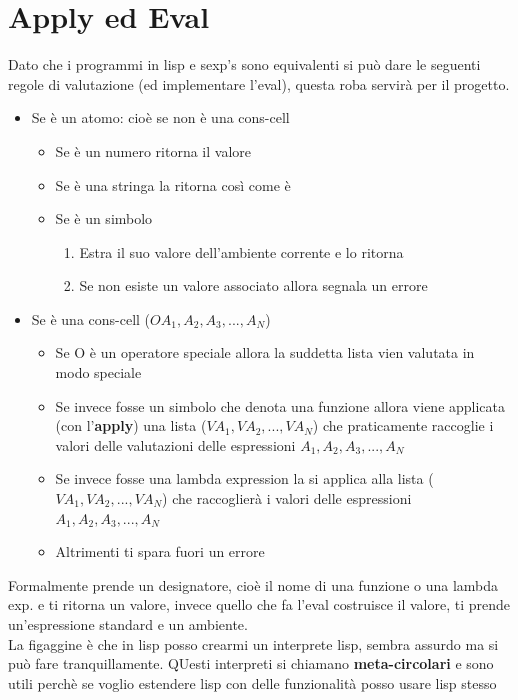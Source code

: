\documentclass[12pt, a4paper, openany, oneside]{book}
\begin{document}
\section{Apply ed Eval}
Dato che i programmi in lisp e sexp's sono equivalenti si può dare le seguenti 
regole di valutazione (ed implementare l'eval), questa roba servirà per il 
progetto.
\begin{itemize}
	\item Se è un atomo: cioè se non è una cons-cell
	\begin{itemize}
		\item Se è un numero ritorna il valore
		\item Se è una stringa la ritorna così come è
		\item Se è un simbolo
		\begin{enumerate}
			\item Estra il suo valore dell'ambiente corrente e lo ritorna
			\item Se non esiste un valore associato allora segnala un errore
		\end{enumerate}
	\end{itemize}
	\item Se è una cons-cell ($O A_{1}, A_{2}, A_{3}, ..., A_{N}$)
	\begin{itemize}
		\item Se O è un operatore speciale allora la suddetta lista vien valutata
		in modo speciale
		\item Se invece fosse un simbolo che denota una funzione allora viene 
		applicata (con l'\textbf{apply}) una lista ($VA_{1}, VA_{2}, ..., VA_{N}$)
		che praticamente raccoglie i valori delle valutazioni delle espressioni
		$A_{1}, A_{2}, A_{3}, ..., A_{N}$
		\item Se invece fosse una lambda expression la si applica alla lista 
		($VA_{1}, VA_{2}, ..., VA_{N}$) che raccoglierà i valori delle espressioni
		$A_{1}, A_{2}, A_{3}, ..., A_{N}$
		\item Altrimenti ti spara fuori un errore
	\end{itemize}
\end{itemize}
Formalmente prende un designatore, cioè il nome di una funzione o una lambda exp. 
e ti ritorna un valore, invece quello che fa l'eval costruisce il valore, ti prende
un'espressione standard e un ambiente.\\
La figaggine è che in lisp posso crearmi un interprete lisp, sembra assurdo ma
si può fare tranquillamente. QUesti interpreti si chiamano \textbf{meta-circolari}
e sono utili perchè se voglio estendere lisp con delle funzionalità posso usare 
lisp stesso
\end{document}
